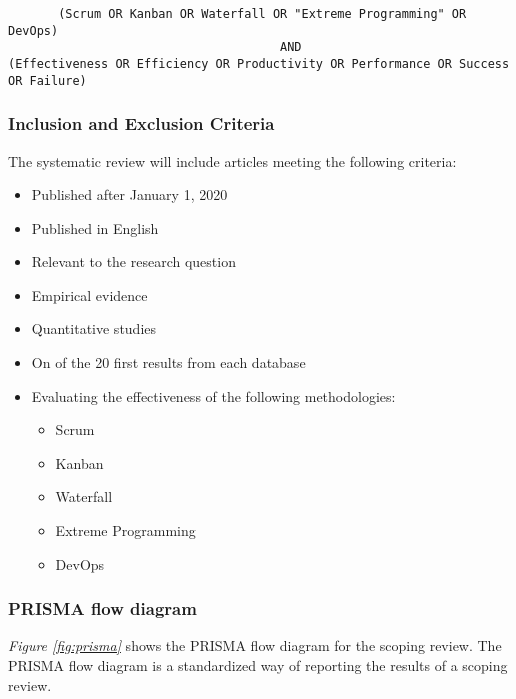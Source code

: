 \documentclass[12pt]{article}
\begin{document}
\begin{adjustwidth}{-4em}{0pt}
\begin{verbatim}
       (Scrum OR Kanban OR Waterfall OR "Extreme Programming" OR DevOps) 
                                      AND
(Effectiveness OR Efficiency OR Productivity OR Performance OR Success OR Failure)
\end{verbatim}
\end{adjustwidth}

\subsubsection{Inclusion and Exclusion Criteria}
The systematic review will include articles meeting the following criteria:
\begin{itemize}
  \item Published after January 1, 2020
  \item Published in English
  \item Relevant to the research question
  \item Empirical evidence
  \item Quantitative studies
  \item On of the 20 first results from each database
  \item Evaluating the effectiveness of the following methodologies:
  \begin{itemize}
    \item Scrum
    \item Kanban
    \item Waterfall
    \item Extreme Programming
    \item DevOps
  \end{itemize}
\end{itemize}

\subsubsection{PRISMA flow diagram}
\textit{Figure \ref{fig:prisma}} shows the PRISMA \cite{PRISMAStatement} flow diagram for the scoping review.
The PRISMA flow diagram is a standardized way of reporting the results of a scoping review.
\end{document}
